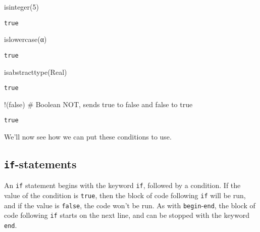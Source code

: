 \documentclass[
  letterpaper,
  DIV=11,
  numbers=noendperiod]{scrreprt}
\newenvironment{Shaded}{\begin{snugshade}}{\end{snugshade}}
\newcommand{\CharTok}[1]{\textcolor[rgb]{0.13,0.47,0.30}{#1}}
\newcommand{\CommentTok}[1]{\textcolor[rgb]{0.37,0.37,0.37}{#1}}
\newcommand{\ConstantTok}[1]{\textcolor[rgb]{0.56,0.35,0.01}{#1}}
\newcommand{\DataTypeTok}[1]{\textcolor[rgb]{0.68,0.00,0.00}{#1}}
\newcommand{\FloatTok}[1]{\textcolor[rgb]{0.68,0.00,0.00}{#1}}
\newcommand{\FunctionTok}[1]{\textcolor[rgb]{0.28,0.35,0.67}{#1}}
\newcommand{\NormalTok}[1]{\textcolor[rgb]{0.00,0.23,0.31}{#1}}
\begin{document}
\begin{Shaded}
\begin{Highlighting}[]
\FunctionTok{isinteger}\NormalTok{(}\FloatTok{5}\NormalTok{)}
\end{Highlighting}
\end{Shaded}

\begin{verbatim}
true
\end{verbatim}

\begin{Shaded}
\begin{Highlighting}[]
\FunctionTok{islowercase}\NormalTok{(}\CharTok{\textquotesingle{}α\textquotesingle{}}\NormalTok{)}
\end{Highlighting}
\end{Shaded}

\begin{verbatim}
true
\end{verbatim}

\begin{Shaded}
\begin{Highlighting}[]
\FunctionTok{isabstracttype}\NormalTok{(}\DataTypeTok{Real}\NormalTok{)}
\end{Highlighting}
\end{Shaded}

\begin{verbatim}
true
\end{verbatim}

\begin{Shaded}
\begin{Highlighting}[]
\NormalTok{!(}\ConstantTok{false}\NormalTok{) }\CommentTok{\# Boolean NOT, sends true to false and false to true}
\end{Highlighting}
\end{Shaded}

\begin{verbatim}
true
\end{verbatim}

We'll now see how we can put these conditions to use.

\hypertarget{if-statements}{%
\subsection{\texorpdfstring{\texttt{if}-statements}{if-statements}}\label{if-statements}}

An \texttt{if} statement begins with the keyword \texttt{if}, followed
by a condition. If the value of the condition is \texttt{true}, then the
block of code following \texttt{if} will be run, and if the value is
\texttt{false}, the code won't be run. As with
\texttt{begin}-\texttt{end}, the block of code following \texttt{if}
starts on the next line, and can be stopped with the keyword
\texttt{end}.
\end{document}
